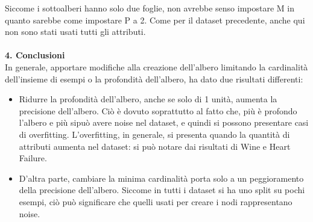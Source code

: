 \documentclass{article}
\begin{document}
Siccome i sottoalberi hanno solo due foglie, non avrebbe senso impostare M in quanto sarebbe come impostare P a 2.
Come per il dataset precedente, anche qui non sono stati usati tutti gli attributi.\\
\\
{\Large \textbf{{\large{4}}. Conclusioni}}\\
In generale, apportare modifiche alla creazione dell'albero limitando la cardinalità dell'insieme di esempi o la profondità dell'albero, ha dato due risultati differenti:
\begin{itemize}
	\item Ridurre la profondità dell'albero, anche se solo di 1 unità, aumenta la precisione dell'albero. Ciò è dovuto soprattutto al fatto che, più è profondo l'albero e più sipuò avere noise nel dataset, e quindi si possono presentare casi di overfitting. L'overfitting, in generale, si presenta quando la quantità di attributi aumenta nel dataset: si può notare dai risultati di Wine e Heart Failure.
	\item D'altra parte, cambiare la minima cardinalità porta solo a un peggioramento della precisione dell'albero. Siccome in tutti i dataset si ha uno split su pochi esempi, ciò può significare che quelli usati per creare i nodi rappresentano noise.
\end{itemize}
\end{document}
